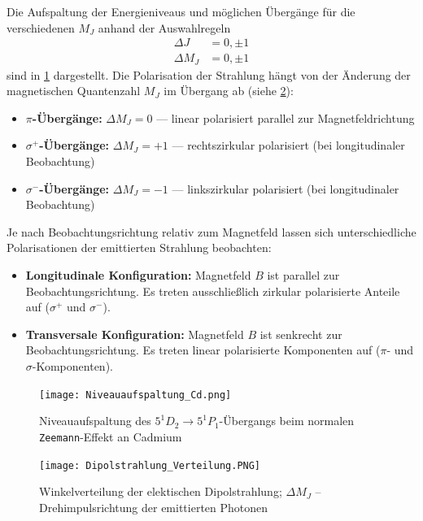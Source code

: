 Die Aufspaltung der Energieniveaus und möglichen Übergänge für die verschiedenen $M_J$ anhand der Auswahlregeln
\begin{align*}
    \Delta J &= 0, \pm 1\\
    \Delta M_J &= 0, \pm 1
\end{align*}
sind in \cref{fig:cd_niveaus} dargestellt.
Die Polarisation der Strahlung hängt von der Änderung der magnetischen Quantenzahl $M_J$ im Übergang ab (siehe \cref{fig:polarisation}):
\begin{itemize}
    \item \textbf{$\pi$-Übergänge:} $\Delta M_J = 0$ — linear polarisiert parallel zur Magnetfeldrichtung
    \item \textbf{$\sigma^+$-Übergänge:} $\Delta M_J = +1$ — rechtszirkular polarisiert (bei longitudinaler Beobachtung)
    \item \textbf{$\sigma^-$-Übergänge:} $\Delta M_J = -1$ — linkszirkular polarisiert (bei longitudinaler Beobachtung)
\end{itemize}
Je nach Beobachtungsrichtung relativ zum Magnetfeld lassen sich unterschiedliche Polarisationen der emittierten Strahlung beobachten:
\begin{itemize}
    \item \textbf{Longitudinale Konfiguration:} Magnetfeld $B$ ist parallel zur Beobachtungsrichtung. Es treten ausschließlich zirkular polarisierte Anteile auf ($\sigma^+$ und $\sigma^-$).
    \item \textbf{Transversale Konfiguration:} Magnetfeld $B$ ist senkrecht zur Beobachtungsrichtung. Es treten linear polarisierte Komponenten auf ($\pi$- und $\sigma$-Komponenten).
\end{itemize}
\begin{figure}[ht]
    \centering
    \texttt{[image: Niveauaufspaltung\_Cd.png]}
    \caption[Niveauaufspaltung des$5^1D_2 \rightarrow 5^1P_1$-Übergangs bei Cd]{Niveauaufspaltung des $5^1D_2 \rightarrow 5^1P_1$-Übergangs beim normalen \texttt{Zeemann}-Effekt an Cadmium~\cite{LD}}\label{fig:cd_niveaus}
\end{figure}
\begin{figure}[!ht]
    \centering
    \texttt{[image: Dipolstrahlung\_Verteilung.PNG]}
    \caption[Winkelverteilung der elektischen Dipolstrahlung]{Winkelverteilung der elektischen Dipolstrahlung; $\Delta M_J$ -- Drehimpulsrichtung der emittierten Photonen~\cite{LD}}\label{fig:polarisation} %
\end{figure}
%
%
